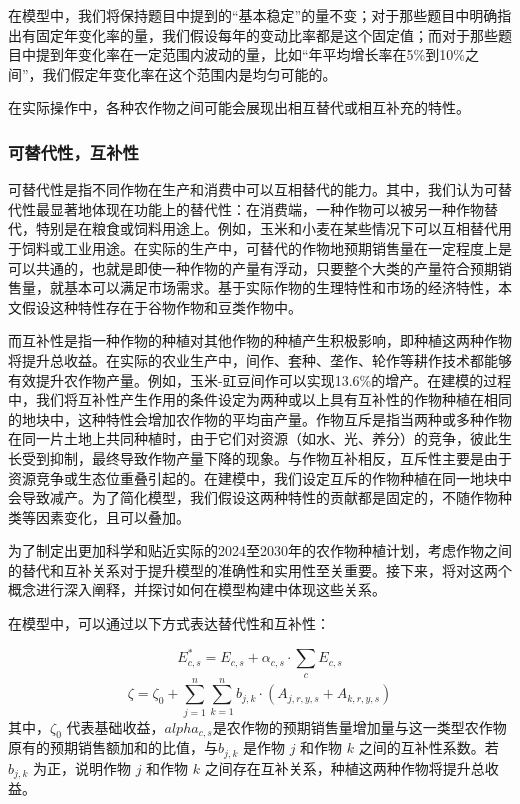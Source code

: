 \documentclass[withoutpreface]{cumcmthesis}
\begin{document}
在模型中，我们将保持题目中提到的“基本稳定”的量不变；对于那些题目中明确指出有固定年变化率的量，我们假设每年的变动比率都是这个固定值；而对于那些题目中提到年变化率在一定范围内波动的量，比如“年平均增长率在5\%到10\%之间”，我们假定年变化率在这个范围内是均匀可能的。

在实际操作中，各种农作物之间可能会展现出相互替代或相互补充的特性。
\subsubsection{可替代性，互补性}
可替代性是指不同作物在生产和消费中可以互相替代的能力。其中，我们认为可替代性最显著地体现在功能上的替代性：在消费端，一种作物可以被另一种作物替代，特别是在粮食或饲料用途上。例如，玉米和小麦在某些情况下可以互相替代用于饲料或工业用途。在实际的生产中，可替代的作物地预期销售量在一定程度上是可以共通的，也就是即使一种作物的产量有浮动，只要整个大类的产量符合预期销售量，就基本可以满足市场需求。基于实际作物的生理特性和市场的经济特性，本文假设这种特性存在于谷物作物\cite{ref4}和豆类作物\cite{ref5}中。
  
而互补性是指一种作物的种植对其他作物的种植产生积极影响，即种植这两种作物将提升总收益。在实际的农业生产中，间作、套种、垄作、轮作等耕作技术都能够有效提升农作物产量。例如，玉米-豇豆间作可以实现13.6\%\cite{ref6}的增产。在建模的过程中，我们将互补性产生作用的条件设定为两种或以上具有互补性的作物种植在相同的地块中，这种特性会增加农作物的平均亩产量。作物互斥是指当两种或多种作物在同一片土地上共同种植时，由于它们对资源（如水、光、养分）的竞争，彼此生长受到抑制，最终导致作物产量下降的现象。与作物互补相反，互斥性主要是由于资源竞争或生态位重叠引起的。在建模中，我们设定互斥的作物种植在同一地块中会导致减产。为了简化模型，我们假设这两种特性的贡献都是固定的，不随作物种类等因素变化，且可以叠加。

为了制定出更加科学和贴近实际的2024至2030年的农作物种植计划，考虑作物之间的替代和互补关系对于提升模型的准确性和实用性至关重要。接下来，将对这两个概念进行深入阐释，并探讨如何在模型构建中体现这些关系。

在模型中，可以通过以下方式表达替代性和互补性：

\begin{equation}
E^*_{c,s} = E_{c,s}   + \alpha_{c,s} \cdot \sum_{c} E_{c,s}
\end{equation}
\begin{equation}
    \zeta = \zeta_0 + \sum_{j=1}^{n} \sum_{k=1}^{n} b_{j,k} \cdot (A_{j,r,y,s} + A_{k,r,y,s})
\end{equation}
    其中，$\zeta_0$ 代表基础收益，$alpha_{c,s}$是农作物的预期销售量增加量与这一类型农作物原有的预期销售额加和的比值，与$b_{j,k}$ 是作物 $j$ 和作物 $k$ 之间的互补性系数。若 $b_{j,k}$ 为正，说明作物 $j$ 和作物 $k$ 之间存在互补关系，种植这两种作物将提升总收益。
\end{document}
